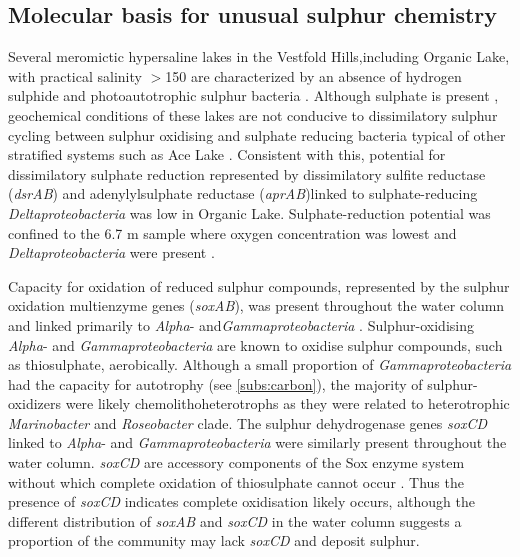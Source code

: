 \subsection{Molecular basis for unusual sulphur chemistry}
Several meromictic hypersaline lakes in the Vestfold Hills,including Organic Lake, with practical salinity $>$150 are characterized by an absence of hydrogen sulphide and photoautotrophic sulphur bacteria \cite{Burke1988}. 
Although sulphate is present \cite{Franzmann1987b}, geochemical conditions of these lakes are not conducive to dissimilatory sulphur cycling between sulphur oxidising and sulphate reducing bacteria typical of other stratified systems such as Ace Lake \cite{Ng2010a, Lauro2011}. 
Consistent with this, potential for dissimilatory sulphate reduction represented by dissimilatory sulfite reductase (\emph{dsrAB}) and adenylylsulphate reductase (\emph{aprAB})linked to sulphate-reducing \emph{Deltaproteobacteria}  was low in Organic Lake. 
Sulphate-reduction potential was confined to the 6.7 m sample  where oxygen concentration was lowest and \emph{Deltaproteobacteria} were present .
 

Capacity for oxidation of reduced sulphur compounds, represented by the sulphur oxidation multienzyme genes (\emph{soxAB}), was present throughout the water column  and linked primarily to \emph{Alpha}- and\emph{Gammaproteobacteria} . 
Sulphur-oxidising \emph{Alpha}- and \emph{Gammaproteobacteria} are known to oxidise sulphur compounds, such as thiosulphate, aerobically. 
Although a small proportion of \emph{Gammaproteobacteria} had the capacity for autotrophy 
(see \ref{subs:carbon}), 
the majority of sulphur-oxidizers were likely chemolithoheterotrophs as they were related to heterotrophic \emph{Marinobacter} and \emph{Roseobacter} clade. 
The sulphur dehydrogenase genes \emph{soxCD} linked to \emph{Alpha}- and \emph{Gammaproteobacteria} were similarly present throughout the water column. 
\emph{soxCD} are accessory components of the Sox enzyme system without which complete oxidation of thiosulphate cannot occur \cite{Friedrich2005}. 
Thus the presence of \emph{soxCD} indicates complete oxidisation likely occurs, although the different distribution of \emph{soxAB} and \emph{soxCD} in the water column  suggests a proportion of the community may lack \emph{soxCD} and deposit sulphur. 


